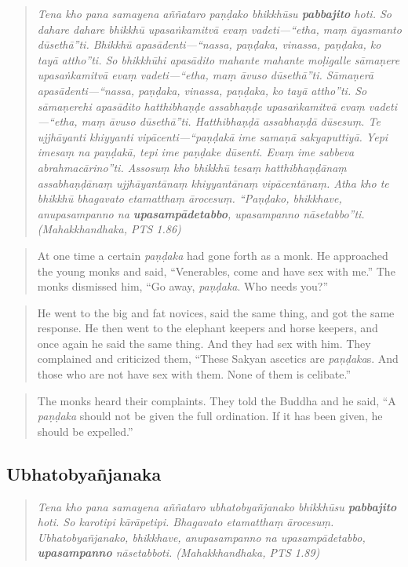 \begin{quote}
{\em Tena kho pana samayena aññataro paṇḍako bhikkhūsu \textbf{pabbajito} hoti. So dahare dahare bhikkhū upasaṅkamitvā evaṃ vadeti—“etha, maṃ āyasmanto dūsethā”ti. Bhikkhū apasādenti—“nassa, paṇḍaka, vinassa, paṇḍaka, ko tayā attho”ti. So bhikkhūhi apasādito mahante mahante moḷigalle sāmaṇere upasaṅkamitvā evaṃ vadeti—“etha, maṃ āvuso dūsethā”ti. Sāmaṇerā apasādenti—“nassa, paṇḍaka, vinassa, paṇḍaka, ko tayā attho”ti. So sāmaṇerehi apasādito hatthibhaṇḍe assabhaṇḍe upasaṅkamitvā evaṃ vadeti—“etha, maṃ āvuso dūsethā”ti. Hatthibhaṇḍā assabhaṇḍā dūsesuṃ. Te ujjhāyanti khiyyanti vipācenti—“paṇḍakā ime samaṇā sakyaputtiyā. Yepi imesaṃ na paṇḍakā, tepi ime paṇḍake dūsenti. Evaṃ ime sabbeva abrahmacārino”ti. Assosuṃ kho bhikkhū tesaṃ hatthibhaṇḍānaṃ assabhaṇḍānaṃ ujjhāyantānaṃ khiyyantānaṃ vipācentānaṃ. Atha kho te bhikkhū bhagavato etamatthaṃ ārocesuṃ. “Paṇḍako, bhikkhave, anupasampanno na \textbf{upasampādetabbo}, upasampanno nāsetabbo”ti. (Mahakkhandhaka, PTS 1.86)}
\end{quote}

\medskip

\begin{quote}
At one time a certain {\em paṇḍaka} had gone forth as a monk. He approached the young monks and said, “Venerables, come and have sex with me.”
The monks dismissed him, “Go away, {\em paṇḍaka}. Who needs you?”
\end{quote}
\begin{quote}
He went to the big and fat novices, said the same thing, and got the same response.
He then went to the elephant keepers and horse keepers, and once again he said the same thing. And they had sex with him. They complained and criticized them, “These Sakyan ascetics are {\em paṇḍaka}s. And those who are not have sex with them. None of them is celibate.”
\end{quote}
\begin{quote}
The monks heard their complaints. They told the Buddha and he said, “A {\em paṇḍaka} should not be given the full ordination. If it has been given, he should be expelled.”
\end{quote}



\subsection{Ubhatob­yañ­janaka}

\begin{quote}
{\em Tena kho pana samayena aññataro ubhatobyañjanako bhikkhūsu \textbf{pabbajito} hoti. So karotipi kārāpetipi. Bhagavato etamatthaṃ ārocesuṃ. Ubhatobyañjanako, bhikkhave, anupasampanno na upasampādetabbo, \textbf{upasampanno} nāsetabboti. (Mahakkhandhaka, PTS 1.89)}
\end{quote}

